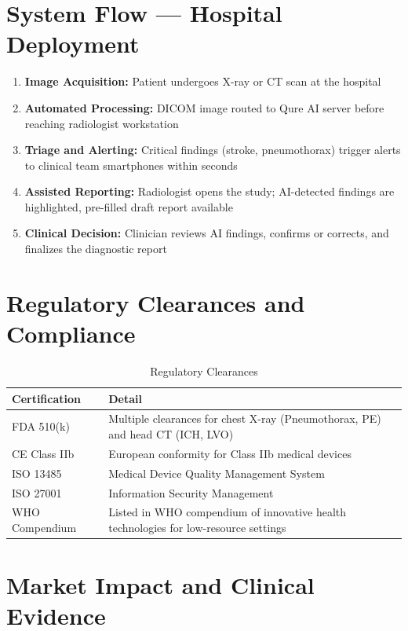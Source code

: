 \documentclass[12pt,a4paper]{article}
\begin{document}
\section{System Flow --- Hospital Deployment}
\begin{enumerate}
    \item \textbf{Image Acquisition:} Patient undergoes X-ray or CT scan at the hospital
    \item \textbf{Automated Processing:} DICOM image routed to Qure AI server before reaching radiologist workstation
    \item \textbf{Triage and Alerting:} Critical findings (stroke, pneumothorax) trigger alerts to clinical team smartphones within seconds
    \item \textbf{Assisted Reporting:} Radiologist opens the study; AI-detected findings are highlighted, pre-filled draft report available
    \item \textbf{Clinical Decision:} Clinician reviews AI findings, confirms or corrects, and finalizes the diagnostic report
\end{enumerate}

\section{Regulatory Clearances and Compliance}

\begin{table}[H]\centering\renewcommand{\arraystretch}{1.4}
\begin{tabularx}{\textwidth}{lX}\toprule
\textbf{Certification} & \textbf{Detail}\\\midrule
FDA 510(k)       & Multiple clearances for chest X-ray (Pneumothorax, PE) and head CT (ICH, LVO) \\
CE Class IIb     & European conformity for Class IIb medical devices \\
ISO 13485        & Medical Device Quality Management System \\
ISO 27001        & Information Security Management \\
WHO Compendium   & Listed in WHO compendium of innovative health technologies for low-resource settings \\
\bottomrule\end{tabularx}\caption{Regulatory Clearances}\end{table}

\section{Market Impact and Clinical Evidence}
\end{document}
